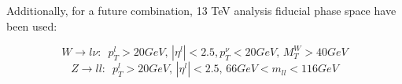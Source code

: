 Additionally, for a future combination, 13 TeV analysis fiducial phase space have been used:

\begin{equation}
W \to l \nu: \, \, \, p_T^l > 20 GeV, \, |\eta^l| < 2.5, p_T^{\nu} <20 GeV, \, M_T^W > 40 GeV
\end{equation}
\begin{equation}
Z \to ll: \, \, \, p_T^l > 20 GeV, \, |\eta^l| < 2.5, \, 66 GeV <m_{ll} < 116 GeV
\end{equation}